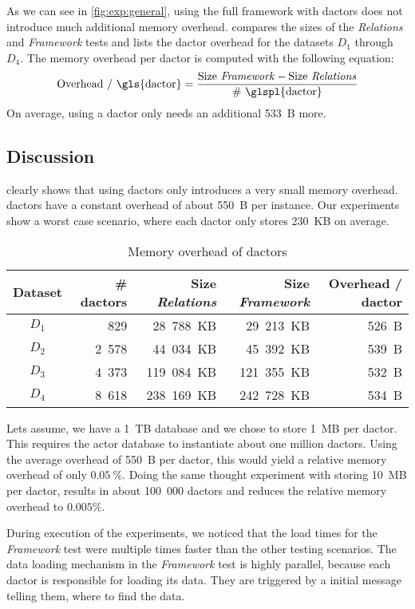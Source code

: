   As we can see in \cref{fig:exp:general}, using the full framework with \glspl{dactor} does not introduce much additional memory overhead.
   compares the sizes of the \textit{Relations} and \textit{Framework} tests and lists the \gls{dactor} overhead for the datasets $D_1$ through $D_4$.
  The memory overhead per \gls{dactor} is computed with the following equation:
  \begin{equation}
    \text{Overhead / \gls{dactor}} = \frac{\text{Size \textit{Framework}} - \text{Size \textit{Relations}}}{\text{\# \glspl{dactor}}}
  \end{equation}
  On average, using a \gls{dactor} only needs an additional 533~B more.


\subsection{Discussion}\label{sec:exp:discussion}

   clearly shows that using \glspl{dactor} only introduces a very small memory overhead.
  \Glspl{dactor} have a constant overhead of about 550~B per instance.
  Our experiments show a worst case scenario, where each \gls{dactor} only stores 230~KB on average.

  \begin{table}
    \centering
    \begin{tabular}{crrrr}
      \toprule
      \textbf{Dataset} & \textbf{\# \Glspl{dactor}} & \textbf{Size \textit{Relations}} & \textbf{Size \textit{Framework}} & \textbf{Overhead / \gls{dactor}}\\
      \midrule
      $D_1$ & 829 & 28~788~KB & 29~213~KB & 526~B \\
      $D_2$ & 2~578 & 44~034~KB & 45~392~KB & 539~B \\
      $D_3$ & 4~373 & 119~084~KB & 121~355~KB & 532~B \\
      $D_4$ & 8~618 & 238~169~KB & 242~728~KB & 534~B \\
      \bottomrule
    \end{tabular}
    \caption{Memory overhead of \glspl{dactor}}
    \label{tab:memory_overhead}
  \end{table}
  
  Lets assume, we have a 1~TB database and we chose to store 1~MB per \gls{dactor}.
  This requires the actor database to instantiate about one million \glspl{dactor}.
  Using the average overhead of 550~B per \gls{dactor}, this would yield a relative memory overhead of only $0.05~\%$.
  Doing the same thought experiment with storing 10~MB per \gls{dactor}, results in about 100~000 \glspl{dactor} and reduces the relative memory overhead to $0.005 \%$.

  During execution of the experiments, we noticed that the load times for the \textit{Framework} test were multiple times faster than the other testing scenarios.
  The data loading mechanism in the \textit{Framework} test is highly parallel, because each \gls{dactor} is responsible for loading its data.
  They are triggered by a initial message telling them, where to find the data.
